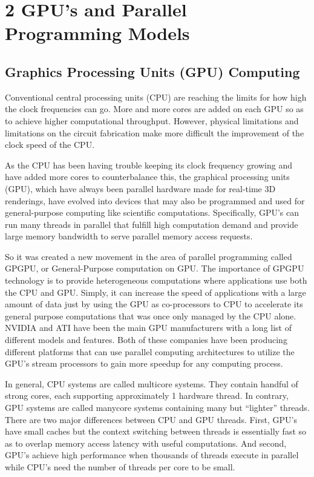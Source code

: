 \chapter{2 GPU’s and Parallel Programming Models}


\section{Graphics Processing Units (GPU) Computing}
Conventional central processing units (CPU) are reaching the limits for how high the clock frequencies can go. More and more cores are added on each GPU so as to achieve higher computational throughput. However, physical limitations and limitations on the circuit fabrication make more difficult the improvement of the clock speed of the CPU.

As the CPU has been having trouble keeping its clock frequency growing and have added more cores to counterbalance this, the graphical processing units (GPU), which have always been parallel hardware made for real-time 3D renderings, have evolved into devices that may also be programmed and used for general-purpose computing like scientific computations. Specifically, GPU’s can run many threads in parallel that fulfill high computation demand and provide large memory bandwidth to serve parallel memory access requests.

So it was created a new movement in the area of parallel programming called GPGPU, or General-Purpose computation on GPU. The importance of GPGPU technology is to provide heterogeneous computations where applications use both the CPU and GPU. Simply, it can increase the speed of applications with a large amount of data just by using the GPU as co-processors to CPU to accelerate its general purpose computations that was once only managed by the CPU alone. NVIDIA and ATI have been the main GPU manufacturers with a long list of different models and features. Both of these companies have been producing different platforms that can use parallel computing architectures to utilize the GPU’s stream processors to gain more speedup for any computing process. 

In general, CPU systems are called multicore systems. They contain handful of strong cores, each supporting approximately 1 hardware thread. In contrary, GPU systems are called manycore systems containing many but “lighter” threads. There are two major differences between CPU and GPU threads. First, GPU’s have small caches but the context switching between threads is essentially fast so as to overlap memory access latency with useful computations. And second, GPU’s achieve high performance when thousands of threads execute in parallel while CPU’s need the number of threads per core to be small. 

